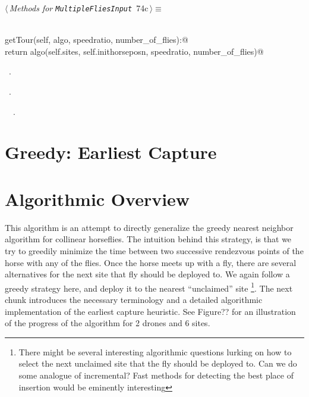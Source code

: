 \documentclass[11.5pt]{report}
\begin{document}
\begin{flushleft} \small\label{scrap111}\raggedright\small
{} $\langle\,${\itshape Methods for \verb|MultipleFliesInput|}\nobreak\ {\footnotesize {74c}}$\,\rangle\equiv$
\vspace{-1ex}
\begin{list}{}{} \item
\mbox{}\verb@@\\
\mbox{}\verb@def getTour(self, algo, speedratio, number_of_flies):@\\
\mbox{}\verb@      return algo(self.sites, self.inithorseposn, speedratio, number_of_flies)@\\
\mbox{}\verb@@{\NWsep}
\end{list}
\vspace{-1.5ex}
\footnotesize
\begin{list}{}{\setlength{\itemsep}{-\parsep}\setlength{\itemindent}{-\leftmargin}}
\item \NWtxtMacroDefBy\ .
\item \NWtxtMacroRefIn\ .
\item \NWtxtIdentsDefed\nobreak\  \verb@getTour@\nobreak\ .
\item{}
\end{list}
\vspace{4ex}
\end{flushleft}


\newpage
\section{ Greedy: Earliest Capture}


\section{Algorithmic Overview}

\newchunk
This algorithm is an attempt to directly generalize the greedy nearest neighbor algorithm for collinear horseflies. 
The intuition behind this strategy, is that we try to greedily minimize the time between two successive rendezvous 
points of the horse with any of the flies. Once the horse meets up with a fly, there are several alternatives for 
the next site that fly should be deployed to. We again follow a greedy strategy here, and deploy 
it to the nearest ``unclaimed'' site \footnote{There might be several interesting
algorithmic questions lurking on how to select the next unclaimed site that the fly should be deployed to. 
Can we do some analogue of incremental? Fast methods for detecting the best place of insertion would be eminently 
interesting}. The next chunk introduces the necessary terminology 
and a detailed algorithmic implementation of the earliest capture heuristic. See Figure?? for an illustration of the 
progress of the algorithm for 2 drones and 6 sites. 
\end{document}
